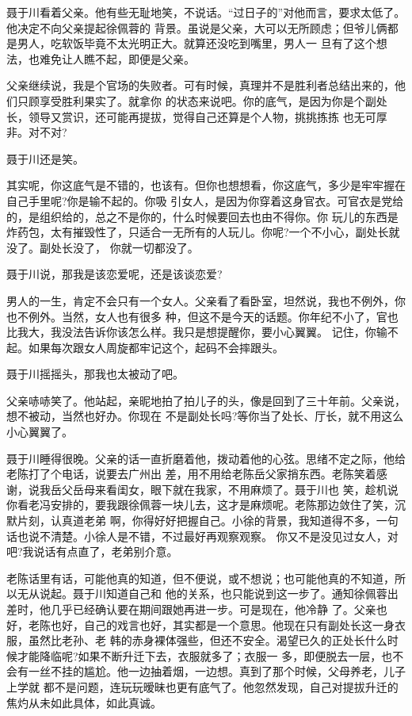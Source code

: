 \documentclass[11pt,a4paper,onecolumn]{article}
\begin{document}
聂于川看着父亲。他有些无耻地笑，不说话。“过日子的”对他而言，要求太低了。他决定不向父亲提起徐佩蓉的
背景。虽说是父亲，大可以无所顾虑；但爷儿俩都是男人，吃软饭毕竟不太光明正大。就算还没吃到嘴里，男人一
旦有了这个想法，也难免让人瞧不起，即便是父亲。

父亲继续说，我是个官场的失败者。可有时候，真理并不是胜利者总结出来的，他们只顾享受胜利果实了。就拿你
的状态来说吧。你的底气，是因为你是个副处长，领导又赏识，还可能再提拔，觉得自己还算是个人物，挑挑拣拣
也无可厚非。对不对?

聂于川还是笑。

其实呢，你这底气是不错的，也该有。但你也想想看，你这底气，多少是牢牢握在自己手里呢?你是输不起的。你吸
引女人，是因为你穿着这身官衣。可官衣是党给的，是组织给的，总之不是你的，什么时候要回去也由不得你。你
玩儿的东西是炸药包，太有摧毁性了，只适合一无所有的人玩儿。你呢?一个不小心，副处长就没了。副处长没了，
你就一切都没了。

聂于川说，那我是该恋爱呢，还是该谈恋爱?

男人的一生，肯定不会只有一个女人。父亲看了看卧室，坦然说，我也不例外，你也不例外。当然，女人也有很多
种，但这不是今天的话题。你年纪不小了，官也比我大，我没法告诉你该怎么样。我只是想提醒你，要小心翼翼。
记住，你输不起。如果每次跟女人周旋都牢记这个，起码不会摔跟头。

聂于川摇摇头，那我也太被动了吧。

父亲哧哧笑了。他站起，亲昵地拍了拍儿子的头，像是回到了三十年前。父亲说，想不被动，当然也好办。你现在
不是副处长吗?等你当了处长、厅长，就不用这么小心翼翼了。

聂于川睡得很晚。父亲的话一直折磨着他，拨动着他的心弦。思绪不定之际，他给老陈打了个电话，说要去广州出
差，用不用给老陈岳父家捎东西。老陈笑着感谢，说我岳父岳母来看闺女，眼下就在我家，不用麻烦了。聂于川也
笑，趁机说你看老冯安排的，要我跟徐佩蓉一块儿去，这才是麻烦呢。老陈那边敛住了笑，沉默片刻，认真道老弟
啊，你得好好把握自己。小徐的背景，我知道得不多，一句话也说不清楚。小徐人是不错，不过最好再观察观察。
你又不是没见过女人，对吧?我说话有点直了，老弟别介意。

老陈话里有话，可能他真的知道，但不便说，或不想说；也可能他真的不知道，所以无从说起。聂于川知道自己和
他的关系，也只能说到这一步了。通知徐佩蓉出差时，他几乎已经确认要在期间跟她再进一步。可是现在，他冷静
了。父亲也好，老陈也好，自己的戏言也好，其实都是一个意思。他现在只有副处长这一身衣服，虽然比老孙、老
韩的赤身裸体强些，但还不安全。渴望已久的正处长什么时候才能降临呢?如果不断升迁下去，衣服就多了；衣服一
多，即便脱去一层，也不会有一丝不挂的尴尬。他一边抽着烟，一边想。真到了那个时候，父母养老，儿子上学就
都不是问题，连玩玩暧昧也更有底气了。他忽然发现，自己对提拔升迁的焦灼从未如此具体，如此真诚。
\end{document}
